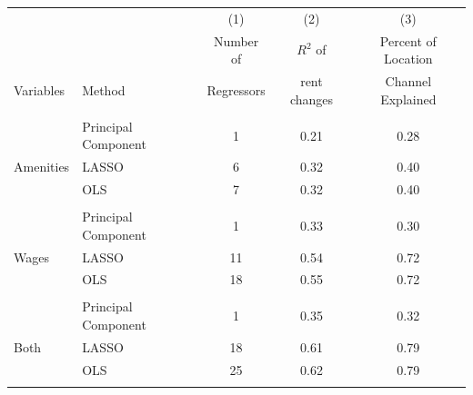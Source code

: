 \begin{tabular}{llccc}
\hline \hline
& & (1) & (2) & (3) \\ 
 &  & Number of &  $R^2 $ of & Percent of Location \\
Variables & Method & Regressors&rent changes & Channel Explained \\
\hline
\\
&  Principal Component &  1 &   0.21 &  0.28 \\
Amenities & LASSO & 6 &   0.32&  0.40 \\
& OLS & 7 &  0.32 &  0.40\\ 
 \\ 
&  Principal Component &  1 &   0.33 &  0.30 \\
Wages & LASSO & 11 &   0.54&  0.72 \\
& OLS & 18 &  0.55 &  0.72\\ 
 \\ 
&  Principal Component &  1 &   0.35 &  0.32 \\
Both & LASSO & 18 &   0.61&  0.79 \\
& OLS & 25 &  0.62 &  0.79\\ 
 \\ 
\hline \hline
\end{tabular}

